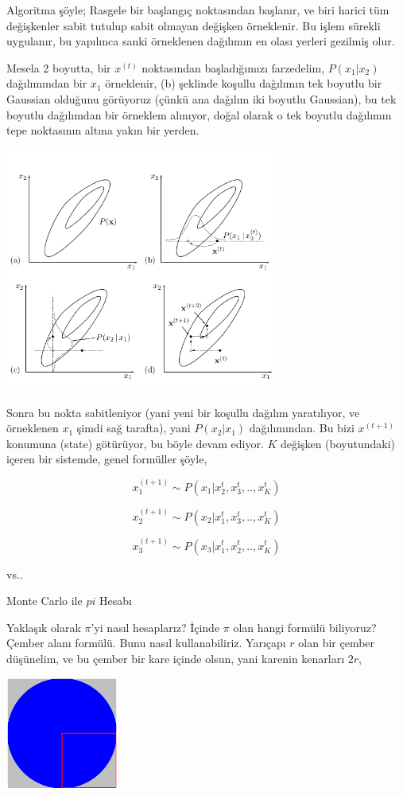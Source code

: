 \documentclass[12pt,fleqn]{article}\usepackage{../../common}
\begin{document}
Algoritma şöyle; Rasgele bir başlangıç noktasından başlanır, ve biri harici
tüm değişkenler sabit tutulup sabit olmayan değişken örneklenir. Bu işlem
sürekli uygulanır, bu yapılınca sanki örneklenen dağılımın en olası yerleri
gezilmiş olur. 

Mesela 2 boyutta, bir $x^{(t)}$ noktasından başladığımızı farzedelim,
$P(x_1|x_2)$ dağılımından bir $x_1$ örneklenir, (b) şeklinde koşullu
dağılımın tek boyutlu bir Gaussian olduğunu görüyoruz (çünkü ana dağılım
iki boyutlu Gaussian), bu tek boyutlu dağılımdan bir örneklem alınıyor,
doğal olarak o tek boyutlu dağılımın tepe noktasının altına yakın bir
yerden.

\includegraphics[height=8cm]{gibbs.png}

Sonra bu nokta sabitleniyor (yani yeni bir koşullu dağılım yaratılıyor, ve
örneklenen $x_1$ şimdi sağ tarafta), yani $P(x_2|x_1)$ dağılımından. Bu
bizi $x^{(t+1)}$ konumuna (state) götürüyor, bu böyle devam ediyor. $K$
değişken (boyutundaki) içeren bir sistemde, genel formüller şöyle,

$$ x_1^{(t+1)} \sim P(x_1 | x_2^{t},x_3^{t},..,x_K^{t}) $$ 

$$ x_2^{(t+1)} \sim P(x_2 | x_1^{t},x_3^{t},..,x_K^{t}) $$ 

$$ x_3^{(t+1)} \sim P(x_3 | x_1^{t},x_2^{t},..,x_K^{t}) $$ 

vs..

Monte Carlo ile $pi$ Hesabı

Yaklaşık olarak $\pi$'yi nasıl hesaplarız? İçinde $\pi$ olan hangi formülü
biliyoruz? Çember alanı formülü. Bunu nasıl kullanabiliriz. Yarıçapı $r$
olan bir çember düşünelim, ve bu çember bir kare içinde olsun, yani karenin
kenarları $2r$,

\includegraphics[width=10em]{stat_mcmc_05.png}
\end{document}
